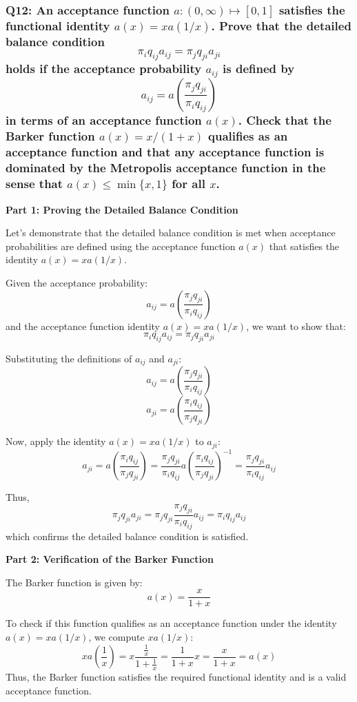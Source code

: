 \documentclass[8pt]{article}
\begin{document}
\subsubsection*{Q12:
An acceptance function \(a : (0, \infty) \mapsto [0, 1]\) satisfies the functional identity \(a(x) = x a(1/x)\). Prove that the detailed balance condition
\[
\pi_i q_{ij} a_{ij} = \pi_j q_{ji} a_{ji}
\]
holds if the acceptance probability \(a_{ij}\) is defined by
\[
a_{ij} = a \left( \frac{\pi_j q_{ji}}{\pi_i q_{ij}} \right)
\]
in terms of an acceptance function \(a(x)\). Check that the Barker function \(a(x) = x / (1 + x)\) qualifies as an acceptance function and that any acceptance function is dominated by the Metropolis acceptance function in the sense that \(a(x) \leq \min\{x, 1\}\) for all \(x\).}

\textbf{Part 1: Proving the Detailed Balance Condition}

Let's demonstrate that the detailed balance condition is met when acceptance probabilities are defined using the acceptance function \( a(x) \) that satisfies the identity \( a(x) = x a(1/x) \).

Given the acceptance probability:
\[
a_{ij} = a \left( \frac{\pi_j q_{ji}}{\pi_i q_{ij}} \right)
\]
and the acceptance function identity \( a(x) = x a(1/x) \), we want to show that:
\[
\pi_i q_{ij} a_{ij} = \pi_j q_{ji} a_{ji}
\]

Substituting the definitions of \(a_{ij}\) and \(a_{ji}\):
\[
a_{ij} = a \left( \frac{\pi_j q_{ji}}{\pi_i q_{ij}} \right)
\]
\[
a_{ji} = a \left( \frac{\pi_i q_{ij}}{\pi_j q_{ji}} \right)
\]

Now, apply the identity \( a(x) = x a(1/x) \) to \( a_{ji} \):
\[
a_{ji} = a \left( \frac{\pi_i q_{ij}}{\pi_j q_{ji}} \right) = \frac{\pi_j q_{ji}}{\pi_i q_{ij}} a \left( \frac{\pi_i q_{ij}}{\pi_j q_{ji}} \right)^{-1} = \frac{\pi_j q_{ji}}{\pi_i q_{ij}} a_{ij}
\]

Thus,
\[
\pi_j q_{ji} a_{ji} = \pi_j q_{ji} \frac{\pi_j q_{ji}}{\pi_i q_{ij}} a_{ij} = \pi_i q_{ij} a_{ij}
\]
which confirms the detailed balance condition is satisfied.

\textbf{Part 2: Verification of the Barker Function}

The Barker function is given by:
\[
a(x) = \frac{x}{1 + x}
\]

To check if this function qualifies as an acceptance function under the identity \( a(x) = x a(1/x) \), we compute \( x a(1/x) \):
\[
x a\left(\frac{1}{x}\right) = x \frac{\frac{1}{x}}{1 + \frac{1}{x}} = \frac{1}{1 + x} x = \frac{x}{1 + x} = a(x)
\]
Thus, the Barker function satisfies the required functional identity and is a valid acceptance function.
\end{document}
